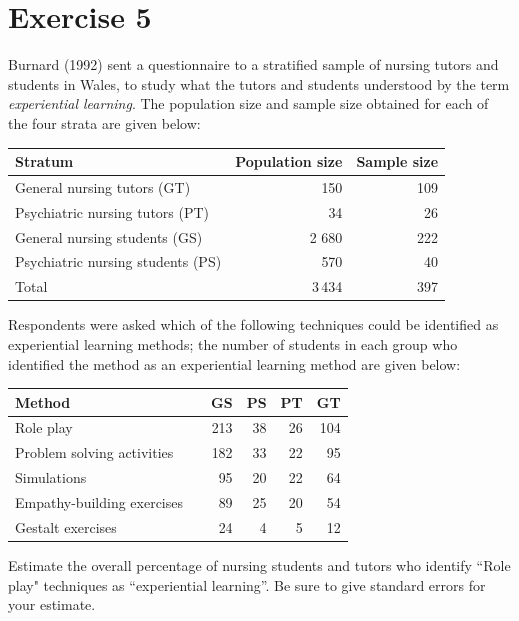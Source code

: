 \documentclass[12pt]{article}
\begin{document}
\section*{Exercise 5}
Burnard (1992) sent a questionnaire to a stratified sample of nursing tutors and students in Wales, to study what the tutors and students understood by the term \emph{experiential learning}. The population size and sample size obtained for each of the four strata are
given below:
\begin{center}
\begin{tabular}{lrr}
Stratum & Population size & Sample size \\
\hline
General nursing tutors (GT) &150 &109\\
Psychiatric nursing tutors (PT)&34 &26\\
General nursing students (GS) &2 680& 222\\
Psychiatric nursing students (PS)&570& 40\\
\hline
Total & 3\,434 &397 \\
\end{tabular}
\end{center}
Respondents were asked which of the following techniques could be identified as experiential learning methods; the number of students in each group who identified
the method as an experiential learning method are given below:
\begin{center}
\begin{tabular}{lrrrrr}
Method & \vline & GS & PS & PT & GT \\
\hline
Role play &\vline & 213 &38& 26 &104\\
Problem solving activities&\vline & 182& 33& 22& 95\\
Simulations &\vline &95 &20 &22 &64\\
Empathy-building exercises &\vline &89 &25& 20& 54\\
Gestalt exercises &\vline &24& 4& 5& 12\\ 
\end{tabular}
\end{center}
Estimate the overall percentage of nursing students and tutors who identify ``Role play" techniques as “experiential learning”. Be sure to give standard errors for your estimate.
\\
\end{document}
